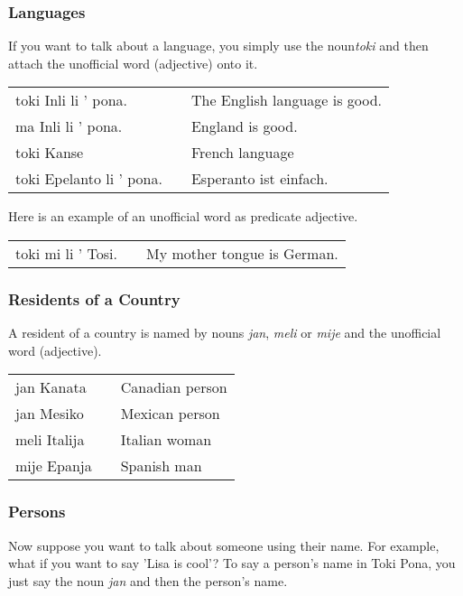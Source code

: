 %
\newpage
\subsubsection*{Languages}
%
If you want to talk about a language, you simply use the noun\textit{toki} and then attach the unofficial word (adjective) onto it. 

\begin{supertabular}{p{5,5cm}|ll}
toki Inli li ' pona. && The English language is good. \\
ma Inli li ' pona. && England is good. \\
toki Kanse && French language \\
toki Epelanto li ' pona. && Esperanto ist einfach. \\
\end{supertabular} 

Here is an example of an unofficial word as predicate adjective.

\begin{supertabular}{p{5,5cm}|ll}
toki mi li ' Tosi. && My mother tongue is German. \\
\end{supertabular}

%
\subsubsection*{Residents of a Country}
%
A resident of a country is named by nouns \textit{jan}, \textit{meli} or \textit{mije} and the unofficial word (adjective).

\begin{supertabular}{p{5,5cm}|ll}
jan Kanata && Canadian person \\
jan Mesiko && Mexican person \\
meli Italija && Italian woman \\
mije Epanja && Spanish man \\
\end{supertabular} 

%
\subsubsection*{Persons}
%
Now suppose you want to talk about someone using their name. 
For example, what if you want to say 'Lisa is cool'? 
To say a person's name in Toki Pona, you just say the noun \textit{jan} and then the person's name. 


